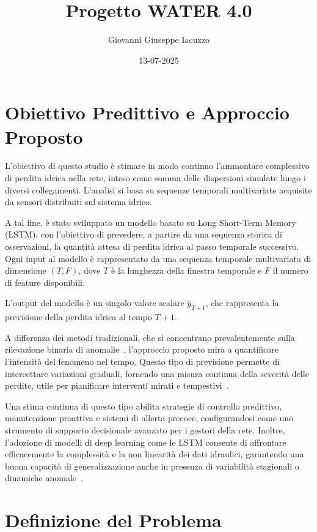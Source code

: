 \documentclass{article}
\title{Progetto WATER 4.0}
\author{Giovanni Giuseppe Iacuzzo}
\date{13-07-2025}
\begin{document}
\sloppy
\maketitle

\section{Obiettivo Predittivo e Approccio Proposto}

L'obiettivo di questo studio è stimare in modo continuo l’ammontare complessivo di perdita idrica 
nella rete, inteso come somma delle dispersioni simulate lungo i diversi collegamenti. L’analisi si 
basa su sequenze temporali multivariate acquisite da sensori distribuiti sul sistema idrico.

A tal fine, è stato sviluppato un modello basato su Long Short-Term Memory (LSTM), con l’obiettivo 
di prevedere, a partire da una sequenza storica di osservazioni, la quantità attesa di perdita 
idrica al passo temporale successivo. Ogni input al modello è rappresentato da una sequenza 
temporale multivariata di dimensione $(T, F)$, dove $T$ è la lunghezza della finestra temporale e 
$F$ il numero di feature disponibili.

L'output del modello è un singolo valore scalare $\hat{y}_{T+1}$, che rappresenta la previsione 
della perdita idrica al tempo $T+1$.

A differenza dei metodi tradizionali, che si concentrano prevalentemente sulla rilevazione binaria 
di anomalie~\cite{piller2020}, l’approccio proposto mira a quantificare l’intensità del fenomeno 
nel tempo. Questo tipo di previsione permette di intercettare variazioni graduali, fornendo una 
misura continua della severità delle perdite, utile per pianificare interventi mirati e 
tempestivi~\cite{candelieri2016, soldevila2016leak}.

Una stima continua di questo tipo abilita strategie di controllo predittivo, manutenzione proattiva 
e sistemi di allerta precoce, configurandosi come uno strumento di supporto decisionale avanzato 
per i gestori della rete. Inoltre, l’adozione di modelli di deep learning come le LSTM consente di 
affrontare efficacemente la complessità e la non linearità dei dati idraulici, garantendo una buona 
capacità di generalizzazione anche in presenza di variabilità stagionali o dinamiche anomale~\cite{bao2019}.

\section{Definizione del Problema}
\end{document}
